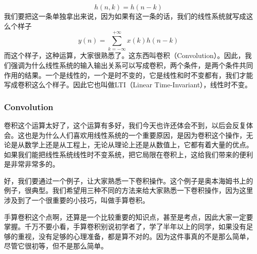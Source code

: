 \documentclass[a4paper,12pt]{article}
\begin{document}
\begin{equation}
   h(n,k) = h(n-k)
\end{equation}
我们要把这一条单独拿出来说，因为如果有这一条的话，我们的线性系统就写成这么个样子
\begin{equation}
   y(n) = \sum_{k=-\infty}^{+\infty}x(k)h(n-k)
\end{equation}
而这个样子，这种运算，大家很熟悉了。这东西叫卷积（Convolution）。因此，我们强调为什么线性系统的输入输出关系可以写成卷积，两个条件，是两个条件共同作用的结果。一个是线性的，一个是时不变的，它是线性和时不变都有，我们才能写成卷积这么个样子。因此它也叫做LTI（Linear Time-Invariant），线性时不变。

\subsubsection{Convolution}\quad

卷积这个运算太好了，这个运算有多好，我们今天也许还体会不到，以后会反复体会。这也是为什么人们喜欢用线性系统的一个重要原因，是因为卷积这个操作，无论是从数学上还是从工程上，无论从理论上还是从数值上，它都有着大量的优点。如果我们能把线性系统线性时不变系统，把它局限在卷积上，这给我们带来的便利是非常非常多的。

好，我们要通过一个例子，让大家熟悉一下卷积操作。这个例子是奥本海姆书上的例子，很典型。我们希望用三种不同的方法来给大家熟悉一下卷积操作，因为这里涉及到了一个很重要的小技巧，叫做手算卷积。

手算卷积这个点啊，还算是一个比较重要的知识点，甚至是考点，因此大家一定要掌握。千万不要小看，手算卷积别说初学者了，学了半年以上的同学，如果没有足够的重视，没有足够的心理准备，都是算不对的。因为这件事真的不是那么简单，尽管它很初等，但不是那么简单。
\end{document}
